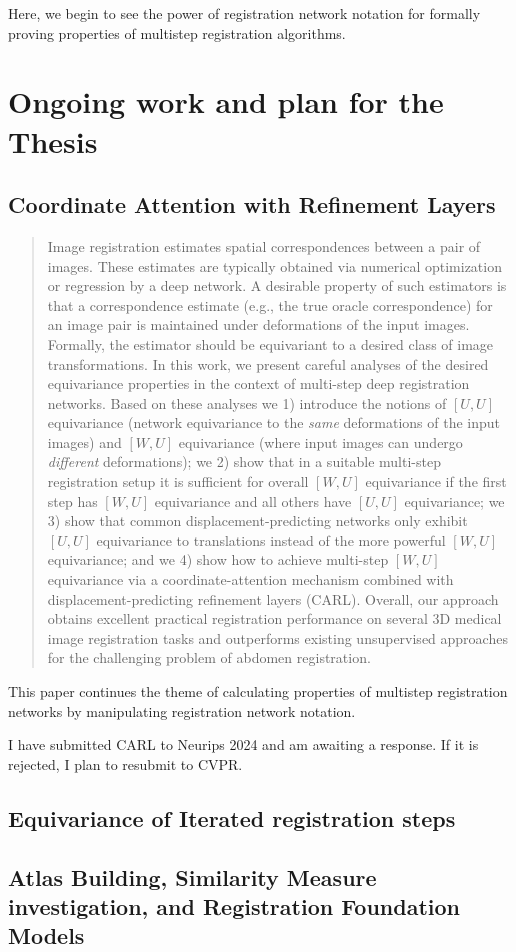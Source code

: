 \documentclass{article}
\begin{document}
Here, we begin to see the power of registration network notation for formally proving properties of multistep registration algorithms. 
\section{Ongoing work and plan for the Thesis}

\subsection{Coordinate Attention with Refinement Layers}

\begin{abstract}
 Image registration estimates spatial correspondences between a pair of images. These estimates are typically obtained via numerical optimization or regression by a deep network. A desirable property of such estimators is that a correspondence estimate (e.g., the true oracle correspondence) for an image pair is maintained under deformations of the input images. Formally, the estimator should be equivariant to a desired class of image transformations. In this work, we present careful analyses of the desired equivariance properties in the context of multi-step deep registration networks. Based on these analyses we 1) introduce the notions of $[U,U]$ equivariance (network equivariance to the \emph{same} deformations of the input images) and $[W,U]$ equivariance (where input images can undergo \emph{different} deformations); we 2) show that in a suitable multi-step registration setup it is sufficient for overall $[W,U]$ equivariance if the first step has $[W,U]$ equivariance and all others have $[U,U]$ equivariance; we 3) show that common displacement-predicting networks only exhibit $[U,U]$ equivariance to translations instead of the more powerful $[W,U]$ equivariance; and we 4) show how to achieve multi-step $[W,U]$ equivariance via a coordinate-attention mechanism combined with displacement-predicting refinement layers (CARL). Overall, our approach obtains excellent practical registration performance on several 3D medical image registration tasks and outperforms existing unsupervised approaches for the challenging problem of abdomen registration.
\end{abstract}

This paper continues the theme of calculating properties of multistep registration networks by manipulating registration network notation. 

I have submitted CARL to Neurips 2024 and am awaiting a response. If it is rejected, I plan to resubmit to CVPR.



\subsection{Equivariance of Iterated registration steps}

\subsection{Atlas Building, Similarity Measure investigation, and Registration Foundation Models}




\end{document}
